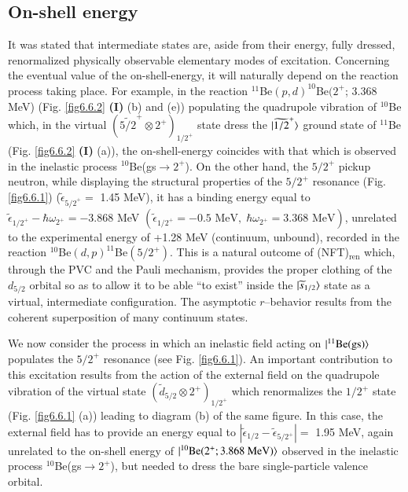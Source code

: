 \subsection{On-shell energy}
It was stated that intermediate states are, aside from their energy,  fully dressed, renormalized physically observable elementary modes of excitation. Concerning the eventual value of the on-shell-energy, it will naturally depend on the reaction process taking place.
For example, in the reaction $^{11}$Be$(p,d)^{10}$Be$(2^+$; 3.368 MeV) (Fig. \ref{fig6.6.2} \textbf{(I)} (b) and (e)) populating the quadrupole vibration of $^{10}$Be which, in the virtual $(\widetilde{5/2}^+\otimes 2^+)_{1/2^+}$ state dress the $|{\widetilde{1/2}^+} \rangle$ ground state of $^{11}$Be (Fig. \ref{fig6.6.2} \textbf{(I)} (a)), the on-shell-energy coincides with that which is observed in the inelastic process $^{10}$Be(gs$\to 2^+$). On the other hand, the $5/2^+$ pickup neutron, while displaying the structural properties of the $5/2^+$ resonance (Fig. \ref{fig6.6.1}) ($\tilde{\epsilon}_{{5/2}^+}=$ 1.45 MeV), it has a binding energy equal to $\tilde{\epsilon}_{{1/2}^+}-\hbar\omega_{2^+}=-3.868$ MeV $(\tilde{\epsilon}_{{1/2}^+}=-0.5\text{ MeV},\; \hbar\omega_{2^+}=3.368\text{ MeV})$, unrelated to the experimental energy of +1.28 MeV (continuum, unbound), recorded in the reaction $^{10}$Be$(d,p)^{11}$Be$(5/2^+)$. This is a natural outcome of (NFT)$_{\text{ren}}$ which, through the PVC and the Pauli mechanism, provides the proper clothing of the $d_{5/2}$ orbital so as to allow it to be able ``to exist'' inside the $|{\widetilde s_{1/2}} \rangle$ state as a virtual, intermediate configuration. The asymptotic $r$--behavior results from the coherent superposition of many continuum states.


We now consider the process in which an inelastic field acting on $|{^{11}\text{Be(gs)}} \rangle$ populates the $5/2^+$ resonance (see Fig. \ref{fig6.6.1}). An important contribution to this excitation results from the action of the external field on the quadrupole vibration of the virtual state $(\tilde d_{5/2}\otimes 2^+)_{1/2^+}$ which renormalizes the $1/2^+$ state (Fig. \ref{fig6.6.1} (a)) leading to diagram (b) of the same figure. In this case, the external field has to provide an energy equal to $|\tilde \epsilon_{1/2}-\tilde \epsilon_{5/2^+}|=$ 1.95 MeV, again unrelated to the on-shell energy of $|{^{10}\text{Be}(2^+; 3.868\text{ MeV})} \rangle$ observed in the inelastic process $^{10}$Be(gs$\to2^+$), but needed to dress the bare single-particle valence orbital.
